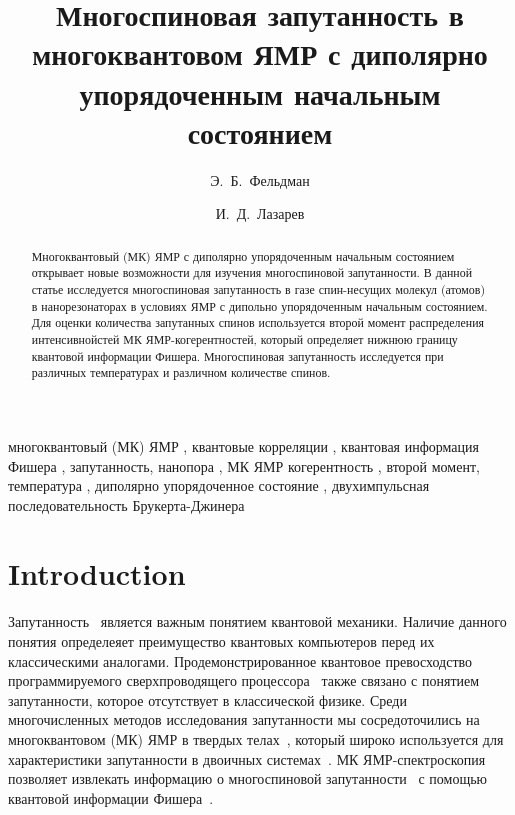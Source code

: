 \documentclass[review]{elsarticle}
\begin{document}
\begin{frontmatter}

\title{Многоспиновая запутанность в многоквантовом ЯМР с диполярно упорядоченным начальным состоянием}

\author[icp]{Э.~Б.~Фельдман}
\author[icp,msu]{И.~Д.~Лазарев} %

\address[icp]{Институт проблем химической физики РАН, \\ Черноголовка, Московская область, Россия 142432}
\address[msu]{Факультет фундаментальной физико-химической инженерии, МГУ GSP-1, Москва, Россия 119991}



\begin{abstract}
Многоквантовый (МК)  ЯМР с диполярно упорядоченным начальным состоянием открывает новые возможности для изучения многоспиновой запутанности. 
В данной статье исследуется многоспиновая запутанность в газе спин-несущих молекул (атомов) в нанорезонаторах
в условиях ЯМР с дипольно упорядоченным начальным состоянием.
Для оценки количества запутанных спинов используется второй момент распределения интенсивнойстей МК ЯМР-когерентностей, 
который определяет нижнюю границу квантовой информации Фишера. 
Многоспиновая запутанность исследуется при различных температурах и различном количестве спинов.
\end{abstract}

\begin{keyword}
многоквантовый (МК) ЯМР \sep  
квантовые корреляции \sep 
квантовая информация Фишера \sep 
запутанность, нанопора \sep 
МК ЯМР когерентность \sep 
второй момент, температура \sep 
диполярно упорядоченное состояние \sep 
двухимпульсная последовательность Брукерта-Джинера
\end{keyword}

\end{frontmatter}


\section{Introduction}
\label{sec:1}

Запутанность~\cite{Nielsen_2009} является важным понятием квантовой механики. Наличие данного понятия определеяет преимущество квантовых компьютеров перед их классическими аналогами. 
Продемонстрированное квантовое превосходство программируемого сверхпроводящего процессора~\cite{Arute2019} также связано с понятием запутанности, которое отсутствует в классической физике.
Среди многочисленных методов исследования запутанности мы сосредоточились на многоквантовом (МК) ЯМР в твердых телах~\cite{Baum_1985}, который широко используется для характеристики запутанности в двоичных системах~\cite{Furman_2008, Furman_2009, Fel_dman_2008, Fel_dman_2012}.
МК ЯМР-спектроскопия~\cite{Baum_1985} позволяет извлекать информацию о многоспиновой запутанности~\cite{G_rttner_2018} с помощью квантовой информации Фишера~\cite{T_th_2014, Pezz__2018}.
\end{document}

